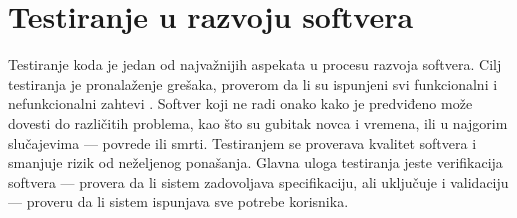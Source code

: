 \documentclass[12pt,oneside]{memoir}
\begin{document}
\section{Testiranje u razvoju softvera}
\label{sec:piramid}

\par Testiranje koda je jedan od najvažnijih aspekata u procesu razvoja softvera. Cilj testiranja je pronalaženje grešaka, proverom da li su ispunjeni svi funkcionalni i nefunkcionalni zahtevi \cite{test}. Softver koji ne radi onako kako je predviđeno može dovesti do različitih problema, kao što su gubitak novca i vremena, ili u najgorim slučajevima --- povrede ili smrti. Testiranjem se proverava kvalitet softvera i smanjuje rizik od neželjenog ponašanja. Glavna uloga testiranja jeste verifikacija softvera --- provera da li sistem zadovoljava specifikaciju, ali uključuje i validaciju --- proveru da li sistem ispunjava sve potrebe korisnika.  

\end{document}

